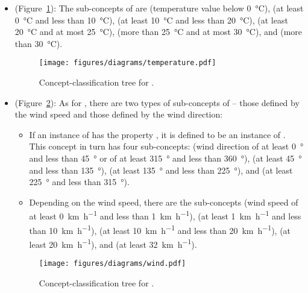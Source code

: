 \begin{itemize}
  \item {} (Figure~\ref{fig:tree_temperature}): The sub-concepts of  are  (temperature value below \SI{0}{\celsius}),  (at least \SI{0}{\celsius} and less than \SI{10}{\celsius}),  (at least \SI{10}{\celsius} and less than \SI{20}{\celsius}),  (at least \SI{20}{\celsius} and at most \SI{25}{\celsius}),  (more than \SI{25}{\celsius} and at most \SI{30}{\celsius}), and  (more than \SI{30}{\celsius}).
  
  \begin{figure}
    \centering
    \texttt{[image: figures/diagrams/temperature.pdf]}
    \caption[Concept-classification tree for ]{Concept-classification tree for .}
    \label{fig:tree_temperature}
  \end{figure}

  \item {} (Figure~\ref{fig:tree_wind}): As for , there are two types of sub-concepts of  -- those defined by the wind speed and those defined by the wind direction:
    \begin{itemize}
      \item If an instance of  has the property , it is defined to be an instance of . This concept in turn has four sub-concepts:  (wind direction of at least \SI{0}{\degree} and less than \SI{45}{\degree} or of at least \SI{315}{\degree} and less than \SI{360}{\degree}),  (at least \SI{45}{\degree} and less than \SI{135}{\degree}),  (at least \SI{135}{\degree} and less than \SI{225}{\degree}), and  (at least \SI{225}{\degree} and less than \SI{315}{\degree}).
      
      \item Depending on the wind speed, there are the sub-concepts  (wind speed of at least \SI{0}{\kilo\metre\per\hour} and less than \SI{1}{\kilo\metre\per\hour}),  (at least \SI{1}{\kilo\metre\per\hour} and less than \SI{10}{\kilo\metre\per\hour}),  (at least \SI{10}{\kilo\metre\per\hour} and less than \SI{20}{\kilo\metre\per\hour}),  (at least \SI{20}{\kilo\metre\per\hour}), and  (at least \SI{32}{\kilo\metre\per\hour}).
      
    \end{itemize}
    
  \begin{figure}
    \centering
    \texttt{[image: figures/diagrams/wind.pdf]}
    \caption[Concept-classification tree for ]{Concept-classification tree for .}
    \label{fig:tree_wind}
  \end{figure}

\end{itemize}

